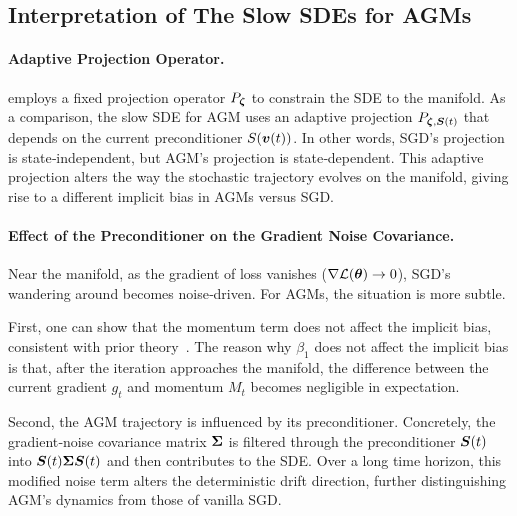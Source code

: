 \subsection{Interpretation of The Slow SDEs for AGMs}
\paragraph{Adaptive Projection Operator.}  
 employs a fixed projection operator $P_{{\bm{\zeta}}}$ to constrain the SDE to the manifold. As a comparison, the slow SDE for AGM uses an adaptive projection $P_{{\bm{\zeta}},{\bm{S}}(t)}$ that depends on the current preconditioner $S({\bm{v}}(t))$. In other words, SGD’s projection is state‐independent, but AGM’s projection is state‐dependent. This adaptive projection alters the way the stochastic trajectory evolves on the manifold, giving rise to a different implicit bias in AGMs versus SGD.

\paragraph{Effect of the Preconditioner on the Gradient Noise Covariance.}  
Near the manifold, as the gradient of loss vanishes ($\nabla \mathcal{L}({\bm{\theta}}) \to 0$), SGD’s wandering around becomes noise‐driven. For AGMs, the situation is more subtle.

First, one can show that the momentum term does not affect the implicit bias, consistent with prior theory~\citep{wang2023marginal}. The reason why  $\beta_1$ does not affect the implicit bias is that, after the iteration approaches the manifold, the difference between the current gradient  $g_t$  and momentum $M_t$ becomes negligible in expectation.  

Second, the AGM trajectory is influenced by its preconditioner. Concretely, the gradient‐noise covariance matrix ${\bm{\Sigma}}$ is filtered through the preconditioner ${\bm{S}}(t)$ into ${\bm{S}}(t){\bm{\Sigma}} {\bm{S}}(t)$ and then contributes to the SDE. Over a long time horizon, this modified noise term alters the deterministic drift direction, further distinguishing AGM’s dynamics from those of vanilla SGD.

